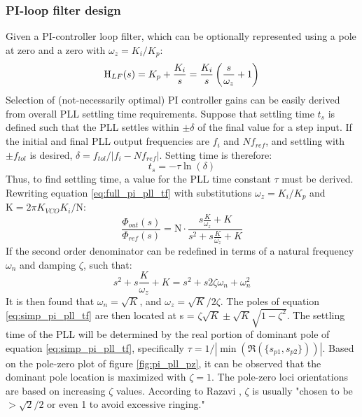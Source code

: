 \subsubsection{PI-loop filter design}
Given a PI-controller loop filter, which can be optionally represented using a pole at zero and a zero with $\omega_z = K_i/K_p$:
\begin{equation} \label{eq:pi_pll_tf}
	\textnormal{H}_{LF}(s) = K_p + \frac{K_i}{s}  = \frac{K_i}{s}\left(\frac{s}{\omega_z} + 1\right) 
\end{equation}
Selection of (not-necessarily optimal) PI controller gains can be easily derived from overall PLL settling time requirements. Suppose that settling time $t_s$ is defined such that the PLL settles within $\pm \delta$ of the final value for a step input. If the initial and final PLL output frequencies are $f_i$ and $Nf_{ref}$, and settling with $\pm f_{tol}$ is desired,  $\delta = f_{tol}/|f_i - Nf_{ref}|$. Setting time is therefore:
\begin{equation}
t_s = -\tau\ln(\delta)
\end{equation}
Thus, to find settling time, a value for the PLL time constant $\tau$ must be derived. Rewriting equation \ref{eq:full_pi_pll_tf} with substitutions $\omega_z = K_i/K_p$ and $\mathrm{K} = 2\pi K_{VCO}K_i/\mathrm{N}$:
\begin{equation} \label{eq:simp_pi_pll_tf}
	\frac{\Phi_{out}(s)}{\Phi_{ref}(s)} = \mathrm{N}\cdot\frac{s\frac{K}{\omega_z} + K }{s^2 + s\frac{K}{\omega_z} + K}
\end{equation}
If the second order denominator can be redefined in terms of a natural frequency $\omega_n$ and damping $\zeta$, such that:
\begin{equation}
	s^2 + s\frac{K}{\omega_z} + K = s^2 + s2\zeta\omega_n + \omega_n^2
\end{equation}
It is then found that $\omega_n = \sqrt{K}$, and $\omega_z = \sqrt{K}/2\zeta$. The poles of equation \ref{eq:simp_pi_pll_tf} are then located at s = $\zeta\sqrt{K} \pm \sqrt{K}\sqrt{1-\zeta^2}$.
The settling time of the PLL will be determined by the real portion of dominant pole of equation \ref{eq:simp_pi_pll_tf}, specifically $\tau = 1/|\min(\Re(\{s_{p1}, s_{p2}\}))|$. Based on the pole-zero plot of figure \ref{fig:pi_pll_pz}, it can be observed that the dominant pole location is maximized with $\zeta=1$. The pole-zero loci orientations are based on increasing $\zeta$ values. According to Razavi \cite{razavi_2017}, $\zeta$ is usually 
"chosen to be $>\sqrt{2}/2$ or even 1 to avoid excessive ringing."
